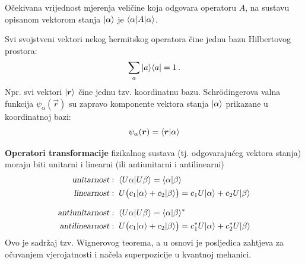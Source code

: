 Očekivana vrijednost mjerenja veličine koja odgovara
operatoru $A$, na sustavu opisanom vektorom stanja
$| \alpha \rangle$ je $\langle \alpha |A| \alpha \rangle$.

Svi svojstveni vektori nekog hermitskog operatora čine jednu bazu
Hilbertovog prostora:
\begin{displaymath}
             \sum_{a} | a \rangle\langle a | = 1 \,.
\end{displaymath}
Npr. svi vektori $\ket{\vec{r}}$ čine jednu tzv. koordinatnu bazu.
Schr\"{o}dingerova valna funkcija $\psi_{\alpha}(\vec{r})$ su zapravo
komponente vektora stanja $| \alpha \rangle$ prikazane u koordinatnoj
bazi:
\begin{displaymath}
            \psi_{\alpha}(\vec{r})=\bra{\vec{r}}\alpha\rangle
\end{displaymath}


\textbf{Operatori transformacije} fizikalnog sustava (tj. odgovarajućeg vektora
stanja) moraju biti unitarni i linearni (ili antiunitarni i antilinearni)
\begin{align*}
\text{\sl unitarnost}&:\; \langle U\alpha |U\beta\rangle = \langle \alpha |\beta\rangle
   \\
\text{\sl linearnost}&:\; U\big(c_1| \alpha \rangle+c_{2}| \beta \rangle\big)=
  c_1 U| \alpha \rangle + c_{2} U| \beta \rangle
   \\[2ex]
\text{\sl antiunitarnost}&:\; \langle U\alpha |U\beta\rangle = \langle \alpha |\beta\rangle^*
  \\
\text{\sl antilinearnost}&:\; U\big(c_1| \alpha \rangle+c_{2}| \beta \rangle\big)=
  c_{1}^* U| \alpha \rangle + c_{2}^* U| \beta \rangle
\end{align*}
Ovo je sadržaj tzv. Wignerovog teorema, a u osnovi
je posljedica zahtjeva za očuvanjem vjerojatnosti i
načela superpozicije u kvantnoj mehanici.

